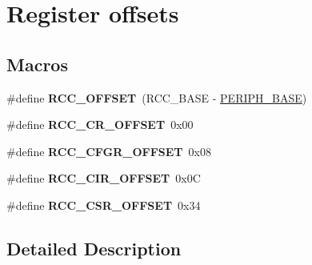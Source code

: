 \hypertarget{group___r_c_c___register___offset}{\section{Register offsets}
\label{group___r_c_c___register___offset}
}
\subsection*{Macros}
\begin{DoxyCompactItemize}
\item 
\hypertarget{group___r_c_c___register___offset_ga539e07c3b3c55f1f1d47231341fb11e1}{\#define {\bfseries R\-C\-C\-\_\-\-O\-F\-F\-S\-E\-T}~(R\-C\-C\-\_\-\-B\-A\-S\-E -\/ \hyperlink{group___peripheral__memory__map_ga9171f49478fa86d932f89e78e73b88b0}{P\-E\-R\-I\-P\-H\-\_\-\-B\-A\-S\-E})}\label{group___r_c_c___register___offset_ga539e07c3b3c55f1f1d47231341fb11e1}

\item 
\hypertarget{group___r_c_c___register___offset_ga6df8d81c05c07cb0c26bbf27ea7fe55c}{\#define {\bfseries R\-C\-C\-\_\-\-C\-R\-\_\-\-O\-F\-F\-S\-E\-T}~0x00}\label{group___r_c_c___register___offset_ga6df8d81c05c07cb0c26bbf27ea7fe55c}

\item 
\hypertarget{group___r_c_c___register___offset_gafb1e90a88869585b970749de3c16ce4a}{\#define {\bfseries R\-C\-C\-\_\-\-C\-F\-G\-R\-\_\-\-O\-F\-F\-S\-E\-T}~0x08}\label{group___r_c_c___register___offset_gafb1e90a88869585b970749de3c16ce4a}

\item 
\hypertarget{group___r_c_c___register___offset_gace77000e86938c6253dc08e8c17e891a}{\#define {\bfseries R\-C\-C\-\_\-\-C\-I\-R\-\_\-\-O\-F\-F\-S\-E\-T}~0x0\-C}\label{group___r_c_c___register___offset_gace77000e86938c6253dc08e8c17e891a}

\item 
\hypertarget{group___r_c_c___register___offset_ga63141585a221eed1fd009eb80e406619}{\#define {\bfseries R\-C\-C\-\_\-\-C\-S\-R\-\_\-\-O\-F\-F\-S\-E\-T}~0x34}\label{group___r_c_c___register___offset_ga63141585a221eed1fd009eb80e406619}

\end{DoxyCompactItemize}


\subsection{Detailed Description}
